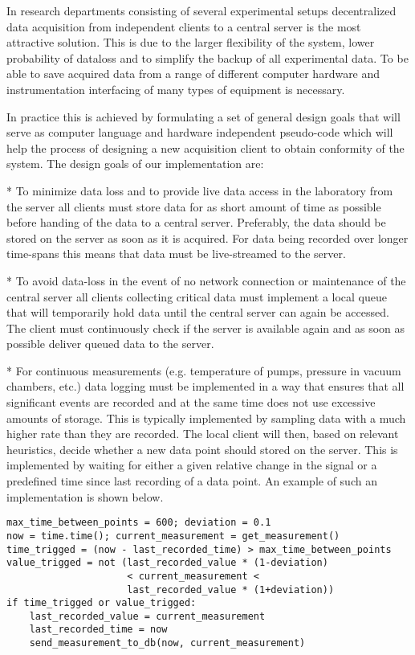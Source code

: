 In research departments consisting of several experimental setups decentralized
data acquisition from independent clients to a central server is the most
attractive solution. This is due to the larger flexibility of the system, lower
probability of dataloss and to simplify the backup of all experimental data. To
be able to save acquired data from a range of different computer hardware and
instrumentation interfacing of many types of equipment is necessary.

In practice this is achieved by formulating a set of general design goals that
will serve as computer language and hardware independent pseudo-code which will
help the process of designing a new acquisition client to obtain conformity of
the system. The design goals of our implementation are:

* To minimize data loss and to provide live data access in the laboratory
  from the server all clients must store data for as short amount of time as
  possible before handing of the data to a central server. Preferably, the data
  should be stored on the server as soon as it is acquired. For data being
  recorded over longer time-spans this means that data must be live-streamed to
  the server.

* To avoid data-loss in the event of no network connection or maintenance
  of the central server all clients collecting critical data must implement a
  local queue that will temporarily hold data until the central server can
  again be accessed. The client must continuously check if the server is
  available again and as soon as possible deliver queued data to the server.

* For continuous measurements (e.g. temperature of pumps, pressure in vacuum
  chambers, etc.) data logging must be implemented in a way that ensures that
  all significant events are recorded and at the same time does not use
  excessive amounts of storage. This is typically implemented by sampling data
  with a much higher rate than they are recorded. The local client will then,
  based on relevant heuristics, decide whether a new data point should stored
  on the server. This is implemented by waiting for either a given relative
  change in the signal or a predefined time since last recording of a data
  point. An example of such an implementation is shown below.

\begin{verbatim}
max_time_between_points = 600; deviation = 0.1
now = time.time(); current_measurement = get_measurement()
time_trigged = (now - last_recorded_time) > max_time_between_points
value_trigged = not (last_recorded_value * (1-deviation)
                     < current_measurement <
                     last_recorded_value * (1+deviation))
if time_trigged or value_trigged:
    last_recorded_value = current_measurement
    last_recorded_time = now
    send_measurement_to_db(now, current_measurement)
\end{verbatim}
  
